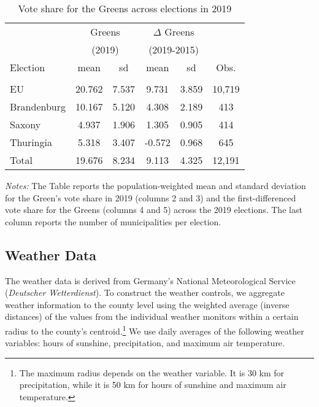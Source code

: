 \begin{table}[ht]\centering
	\begin{threeparttable}
		\caption{Vote share for the Greens across elections in 2019}
		\label{tab_greta_cons:data_greens_vote_share}
		\begin{tabular*}{.7\linewidth}{@{\extracolsep{\fill}}l*{5}{c}}
			\toprule
			
			&\multicolumn{2}{c}{Greens}&\multicolumn{2}{c}{$\Delta$ Greens}\\
			&\multicolumn{2}{c}{(2019)}&\multicolumn{2}{c}{(2019-2015)}\\
			\cmidrule(lr){2-3}\cmidrule(lr){4-5}
			Election		&	mean		&	sd		&	mean	& sd	&	Obs.	\\
			\midrule\\
			
			EU				&	20.762		&	7.537	&	9.731	& 3.859	&	10,719	\\
			Brandenburg		&	10.167		&	5.120	&	4.308	& 2.189	&	413		\\
			Saxony			&	4.937		&	1.906	&	1.305	& 0.905	&	414		\\
			Thuringia		&	5.318		&	3.407	&	-0.572	& 0.968	&	645		\\
			\midrule
			Total			&	19.676		&	8.234	&	9.113	& 4.325	&	12,191	\\
			\bottomrule
		\end{tabular*}
		\begin{tablenotes} 
			\item \scriptsize \emph{Notes:} The Table reports the population-weighted mean and standard deviation for the Green's vote share in 2019 (columns 2 and 3) and the first-differenced vote share for the Greens (columns 4 and 5) across the 2019 elections. The last column reports the number of municipalities per election. 
		\end{tablenotes} 
	\end{threeparttable}
\end{table}







\subsection{Weather Data}
The weather data is derived from Germany's National Meteorological Service (\textit{Deutscher Wetterdienst}). To construct the weather controls, we aggregate weather information to the county level using the weighted average (inverse distances) of the values from the individual weather monitors within a certain radius to the county's centroid.\footnote{The maximum radius depends on the weather variable. It is 30 km for precipitation, while it is 50 km for hours of sunshine and maximum air temperature.} We use daily averages of the following weather variables: hours of sunshine, precipitation, and maximum air temperature. 



